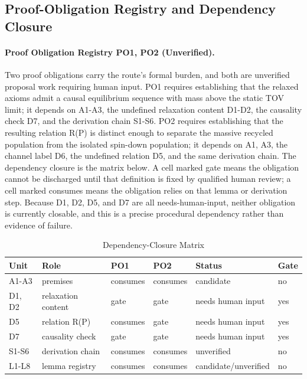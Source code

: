 \documentclass[conference]{IEEEtran}
\begin{document}
\subsection{Proof-Obligation Registry and Dependency Closure}
\paragraph{Proof Obligation Registry PO1, PO2 (Unverified).} Two proof obligations carry the route's formal burden, and both are unverified proposal work requiring human input. PO1 requires establishing that the relaxed axioms admit a causal equilibrium sequence with mass above the static TOV limit; it depends on A1-A3, the undefined relaxation content D1-D2, the causality check D7, and the derivation chain S1-S6. PO2 requires establishing that the resulting relation R(P) is distinct enough to separate the massive recycled population from the isolated spin-down population; it depends on A1, A3, the channel label D6, the undefined relation D5, and the same derivation chain. The dependency closure is the matrix below. A cell marked gate means the obligation cannot be discharged until that definition is fixed by qualified human review; a cell marked consumes means the obligation relies on that lemma or derivation step. Because D1, D2, D5, and D7 are all needs-human-input, neither obligation is currently closable, and this is a precise procedural dependency rather than evidence of failure.

\begin{table}[htbp]
\centering
\footnotesize
\setlength{\tabcolsep}{3pt}
\renewcommand{\arraystretch}{1.12}
\caption{Dependency-Closure Matrix}
\label{tab:definitions-and-propositions-dp-dep-matrix}
\begin{tabular}{|p{}|p{}|p{}|p{}|p{}|p{}|}
\hline
Unit & Role & PO1 & PO2 & Status & Gate \\\hline
A1-A3 & premises & consumes & consumes & candidate & no \\\hline
D1, D2 & relaxation content & gate & gate & needs human input & yes \\\hline
D5 & relation R(P) & consumes & gate & needs human input & yes \\\hline
D7 & causality check & gate & gate & needs human input & yes \\\hline
S1-S6 & derivation chain & consumes & consumes & unverified & no \\\hline
L1-L8 & lemma registry & consumes & consumes & candidate/unverified & no \\\hline
\end{tabular}
\end{table}
\end{document}

